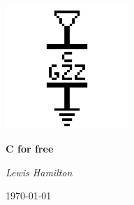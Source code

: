 \documentclass{article}
\begin{document}
\begin{titlepage}
    \centering
    \includegraphics[width=0.35\textwidth]{czgzzlogo.png}\par\vspace{1cm}
    \vspace{1.5cm}
    {\huge\bfseries C for free \par}
    \vspace{2cm}
    {\Large\itshape Lewis Hamilton\\}


    {\large \today\par}
\end{titlepage}



\end{document}
